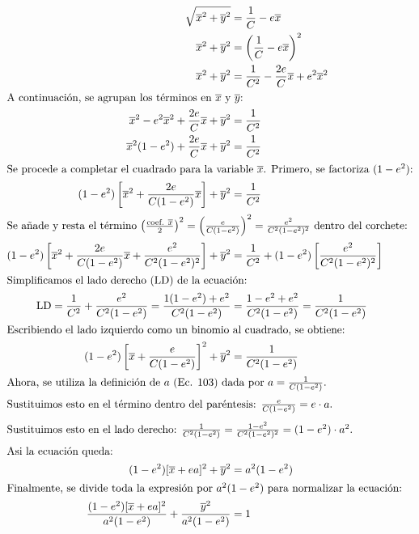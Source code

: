 \documentclass[12pt, a4paper]{article}
\newcommand{\xbar}{\overline{x}}
\newcommand{\ybar}{\overline{y}}
\begin{document}
\begin{align}
    \sqrt{\xbar^{2}+\ybar^{2}} &= \frac{1}{C}-e\xbar \\
    \xbar^{2}+\ybar^{2} &= \left(\frac{1}{C}-e\xbar\right)^{2} \\
    \xbar^{2}+\ybar^{2} &= \frac{1}{C^{2}} - \frac{2e}{C}\xbar + e^{2}\xbar^{2} \\
    \intertext{A continuación, se agrupan los términos en $\xbar$ y $\ybar$:}
    \xbar^{2} - e^{2}\xbar^{2} + \frac{2e}{C}\xbar + \ybar^{2} &= \frac{1}{C^{2}} \\
    \xbar^{2}(1-e^{2}) + \frac{2e}{C}\xbar + \ybar^{2} &= \frac{1}{C^{2}} \\
    \intertext{Se procede a completar el cuadrado para la variable $\xbar$. Primero, se factoriza $(1-e^{2})$:}
    (1-e^{2}) \left[\xbar^{2} + \frac{2e}{C(1-e^{2})}\xbar\right] + \ybar^{2} &= \frac{1}{C^{2}} \\
    \intertext{Se añade y resta el término $\left(\frac{\text{coef. } \xbar}{2}\right)^{2} = \left(\frac{e}{C(1-e^{2})}\right)^{2} = \frac{e^{2}}{C^{2}(1-e^{2})^{2}}$ dentro del corchete:}
    (1-e^{2}) \left[\xbar^{2} + \frac{2e}{C(1-e^{2})}\xbar + \frac{e^{2}}{C^{2}(1-e^{2})^{2}}\right] + \ybar^{2} &= \frac{1}{C^{2}} + (1-e^{2})\left[\frac{e^{2}}{C^{2}(1-e^{2})^{2}}\right] \\
    \intertext{Simplificamos el lado derecho (LD) de la ecuación:}
    \text{LD} = \frac{1}{C^{2}} + \frac{e^{2}}{C^{2}(1-e^{2})} = \frac{1(1-e^{2}) + e^{2}}{C^{2}(1-e^{2})} &= \frac{1-e^{2}+e^{2}}{C^{2}(1-e^{2})} = \frac{1}{C^{2}(1-e^{2})} \\
    \intertext{Escribiendo el lado izquierdo como un binomio al cuadrado, se obtiene:}
    (1-e^{2}) \left[\xbar + \frac{e}{C(1-e^{2})}\right]^{2} + \ybar^{2} &= \frac{1}{C^{2}(1-e^{2})} \\
    \intertext{Ahora, se utiliza la definición de $a$ (Ec. 103) dada por $a = \frac{1}{C(1-e^{2})}$.}
    \intertext{Sustituimos esto en el término dentro del paréntesis: $\frac{e}{C(1-e^{2})} = e \cdot a$.}
    \intertext{Sustituimos esto en el lado derecho: $\frac{1}{C^{2}(1-e^{2})} = \frac{1-e^{2}}{C^{2}(1-e^{2})^{2}} = (1-e^{2}) \cdot a^{2}$.}
    \intertext{Asi la ecuación queda:}
    (1-e^{2})[\xbar + ea]^{2} + \ybar^{2} &= a^{2}(1-e^{2}) \\
    \intertext{Finalmente, se divide toda la expresión por $a^{2}(1-e^{2})$ para normalizar la ecuación:}
    \frac{(1-e^{2})[\xbar + ea]^{2}}{a^{2}(1-e^{2})} + \frac{\ybar^{2}}{a^{2}(1-e^{2})} &= 1
\end{align}
\end{document}
